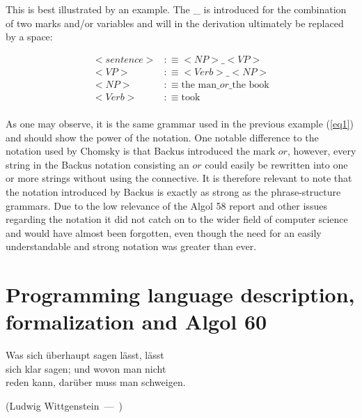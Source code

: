 \documentclass{article}
\let\oldquote\quote
\let\endoldquote\endquote
\renewenvironment{quote}[2][]
{\if\relax\detokenize{#1}\relax
	\def\quoteauthor{#2}%
	\else
	\def\quoteauthor{#2~---~#1}%
	\fi
	\oldquote}
{\par\nobreak\smallskip\hfill(\quoteauthor)%
	\endoldquote\addvspace{\bigskipamount}}
\begin{document}
This is best illustrated by an example. The \_ is introduced for the combination of two marks and/or variables and will in the derivation ultimately be replaced by a space:

\begin{equation} \label{eq2}
	\begin{split}
		<sentence> &:\equiv<NP>\_<VP> \\
		<VP> &:\equiv<Verb>\_<NP > \\
		<NP> &:\equiv\text{the man}\_or\_\text{the book} \\
		<Verb> &:\equiv\text{took} \\
	\end{split}
\end{equation}

As one may observe, it is the same grammar used in the previous example (\ref{eq1}) and should show the power of the notation. One notable difference to the notation used by Chomsky is that Backus introduced the mark $or$, however, every string in the Backus notation consisting an $or$ could easily be rewritten into one or more strings without using the connective. It is therefore relevant to note that the notation introduced by Backus is exactly as strong as the phrase-structure grammars. Due to the low relevance of the Algol 58 report and other issues regarding the notation it did not catch on to the wider field of computer science and would have almost been forgotten, even though the need for an easily understandable and strong notation was greater than ever.

\section{Programming language description, formalization and Algol 60}

\begin{quote}{Ludwig Wittgenstein}
	\begin{flushright}
		Was sich überhaupt sagen lässt, lässt \\ sich klar sagen; und wovon man nicht \\ reden kann, darüber muss man schweigen.
	\end{flushright}
\end{quote}
\end{document}
